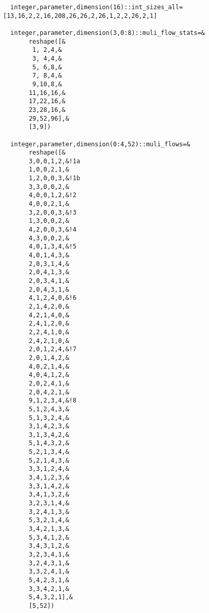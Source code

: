 \begin{Verbatim}
  integer,parameter,dimension(16)::int_sizes_all=[13,16,2,2,16,208,26,26,2,26,1,2,2,26,2,1]

  integer,parameter,dimension(3,0:8)::muli_flow_stats=&
       reshape([&
        1, 2,4,&
        3, 4,4,&
        5, 6,8,&
        7, 8,4,&
        9,10,8,&
       11,16,16,&
       17,22,16,&
       23,28,16,&
       29,52,96],&
       [3,9])

  integer,parameter,dimension(0:4,52)::muli_flows=&
       reshape([&
       3,0,0,1,2,&!1a
       1,0,0,2,1,&
       1,2,0,0,3,&!1b
       3,3,0,0,2,&
       4,0,0,1,2,&!2
       4,0,0,2,1,&
       3,2,0,0,3,&!3
       1,3,0,0,2,&
       4,2,0,0,3,&!4
       4,3,0,0,2,&
       4,0,1,3,4,&!5
       4,0,1,4,3,&
       2,0,3,1,4,&
       2,0,4,1,3,&
       2,0,3,4,1,&
       2,0,4,3,1,&
       4,1,2,4,0,&!6
       2,1,4,2,0,&
       4,2,1,4,0,&
       2,4,1,2,0,&
       2,2,4,1,0,&
       2,4,2,1,0,&
       2,0,1,2,4,&!7
       2,0,1,4,2,&
       4,0,2,1,4,&
       4,0,4,1,2,&
       2,0,2,4,1,&
       2,0,4,2,1,&
       9,1,2,3,4,&!8
       5,1,2,4,3,&
       5,1,3,2,4,&
       3,1,4,2,3,&
       3,1,3,4,2,&
       5,1,4,3,2,&
       5,2,1,3,4,&
       5,2,1,4,3,&
       3,3,1,2,4,&
       3,4,1,2,3,&
       3,3,1,4,2,&
       3,4,1,3,2,&
       3,2,3,1,4,&
       3,2,4,1,3,&
       5,3,2,1,4,&
       3,4,2,1,3,&
       5,3,4,1,2,&
       3,4,3,1,2,&
       3,2,3,4,1,&
       3,2,4,3,1,&
       3,3,2,4,1,&
       5,4,2,3,1,&
       3,3,4,2,1,&
       5,4,3,2,1],&
       [5,52])
\end{Verbatim}
